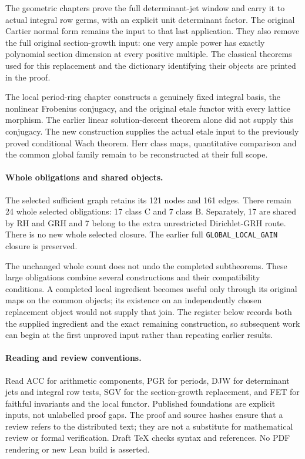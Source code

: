 \documentclass[11pt,a4paper]{article}
\numberwithin{equation}{section}
\theoremstyle{remark}\newtheorem{remark}[theorem]{Remark}
\begin{document}
The geometric chapters prove the full determinant-jet window and carry it
to actual integral row germs, with an explicit unit determinant factor.
The original Cartier normal form remains the input to that last
application.  They also remove the full original section-growth input:
one very ample power has exactly polynomial section dimension at every
positive multiple.  The classical theorems used for this replacement and
the dictionary identifying their objects are printed in the proof.

The local period-ring chapter constructs a genuinely fixed integral basis,
the nonlinear Frobenius conjugacy, and the original etale functor with
every lattice morphism.  The earlier linear solution-descent theorem
alone did not supply this conjugacy.  The new construction supplies the
actual etale input to the previously proved conditional Wach theorem.
Herr class maps, quantitative comparison and the common global family
remain to be reconstructed at their full scope.

\paragraph{Whole obligations and shared objects.}
The selected sufficient graph retains its 121 nodes and 161 edges.
There remain 24 whole selected obligations: 17 class C and 7
class B.  Separately, 17 are shared by RH and GRH and 7
belong to the extra unrestricted Dirichlet-GRH route.  There is no new
whole selected closure.  The earlier full
\texttt{GLOBAL\_\allowbreak LOCAL\_\allowbreak GAIN} closure is preserved.

The unchanged whole count does not undo the completed subtheorems.
These large obligations combine several constructions and their
compatibility conditions.  A completed local ingredient becomes useful
only through its original maps on the common objects; its existence on
an independently chosen replacement object would not supply that join.
The register below records both the supplied ingredient and the exact
remaining construction, so subsequent work can begin at the first
unproved input rather than repeating earlier results.

\paragraph{Reading and review conventions.}
Read ACC for arithmetic components, PGR for periods, DJW for determinant
jets and integral row tests, SGV for the section-growth replacement,
and FET for faithful invariants and the local functor.  Published
foundations are explicit inputs, not unlabelled proof gaps.  The proof
and source hashes ensure that a review refers to the distributed text;
they are not a substitute for mathematical review or formal verification.
Draft TeX checks syntax and references.  No PDF rendering or new Lean
build is asserted.
\end{document}
